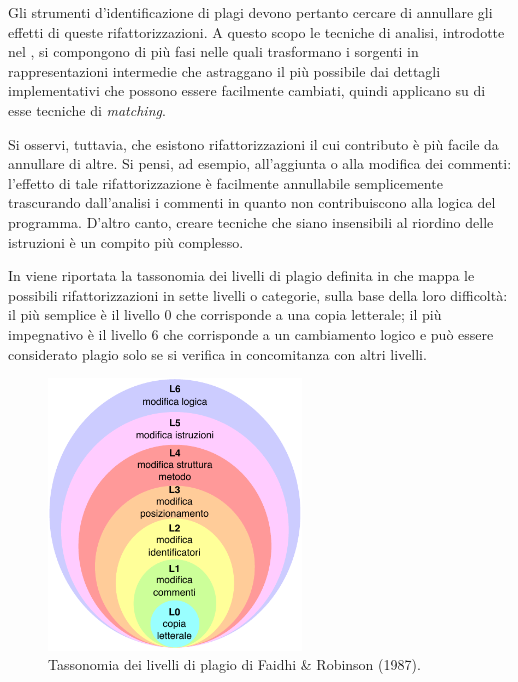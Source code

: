 Gli strumenti d'identificazione di plagi devono pertanto cercare di annullare gli effetti di queste rifattorizzazioni.
%
A questo scopo le tecniche di analisi, introdotte nel , si compongono di più fasi nelle quali trasformano i sorgenti in rappresentazioni intermedie che astraggano il più possibile dai dettagli implementativi che possono essere facilmente cambiati, quindi applicano su di esse tecniche di \textit{matching}.

Si osservi, tuttavia, che esistono rifattorizzazioni il cui contributo è più facile da annullare di altre. 
%
Si pensi, ad esempio, all'aggiunta o alla modifica dei commenti: l'effetto di tale rifattorizzazione è facilmente annullabile semplicemente trascurando dall'analisi i commenti in quanto non contribuiscono alla logica del programma. 
%
D'altro canto, creare tecniche che siano insensibili al riordino delle istruzioni è un compito più complesso.

In  viene riportata la tassonomia dei livelli di plagio definita in \cite{faidhi-robinson-1987} che mappa le possibili rifattorizzazioni in sette livelli o categorie, sulla base della loro difficoltà: il più semplice è il livello 0 che corrisponde a una copia letterale; il più impegnativo è il livello 6 che corrisponde a un cambiamento logico e può essere considerato plagio solo se si verifica in concomitanza con altri livelli.

\begin{figure}[h]
    \centering
    \includegraphics[width=0.6\textwidth]{resources/img/01-levels-of-plagiarism.pdf}
    \caption{Tassonomia dei livelli di plagio di Faidhi \& Robinson (1987).}
    \label{img:01-levels-of-plagiarism}
\end{figure}

